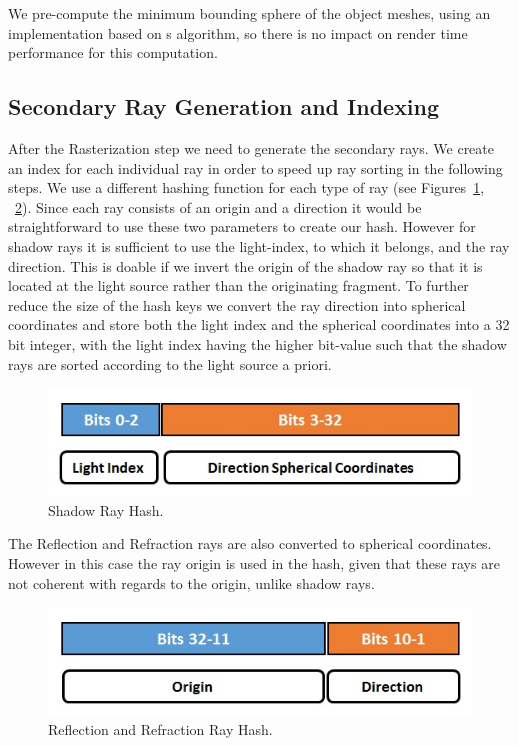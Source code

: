 We pre-compute the minimum bounding sphere of the object meshes, using an implementation based on \cite{Gartner99}s algorithm, so there is no impact on render time performance for this computation.

\subsection{Secondary Ray Generation and Indexing}

After the Rasterization step we need to generate the secondary rays. We create an index for each individual ray in order to speed up ray sorting in the following steps. We use a different hashing function for each type of ray (see Figures~\ref{fig:sr}, ~\ref{fig:rr}). Since each ray consists of an origin and a direction it would be straightforward to use these two parameters to create our hash. However for shadow rays it is sufficient to use the light-index, to which it belongs, and the ray direction. This is doable if we invert the origin of the shadow ray so that it is located at the light source rather than the originating fragment. To further reduce the size of the hash keys we convert the ray direction into spherical coordinates \cite{GraphicGems5} and store both the light index and the spherical coordinates into a 32 bit integer, with the light index having the higher bit-value such that the shadow rays are sorted according to the light source a priori.

\begin{figure}[!htb]
    \centering
    \includegraphics[scale=0.75]{Images/Shadow_Hash}
    \caption{\label{fig:sr}Shadow Ray Hash.}
\end{figure}

The Reflection and Refraction rays are also converted to spherical coordinates. However in this case the ray origin is used in the hash, given that these rays are not coherent with regards to the origin, unlike shadow rays.

\begin{figure}[!htb]
    \centering
    \includegraphics[scale=0.75]{Images/Reflection_Hash}
    \caption{\label{fig:rr}Reflection and Refraction Ray Hash.}
\end{figure}

